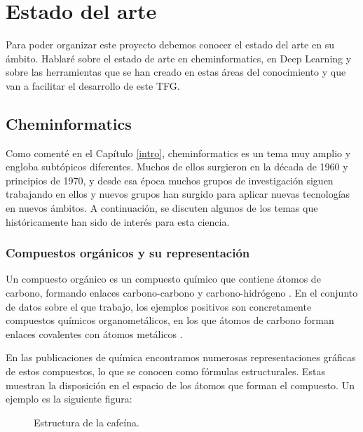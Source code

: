 \chapter{Estado del arte}
Para poder organizar este proyecto debemos conocer el estado del arte en su ámbito. Hablaré sobre el estado de arte en cheminformatics, en Deep Learning y sobre las herramientas que se han creado en estas áreas del conocimiento y que  van a facilitar el desarrollo de este TFG.

\section{Cheminformatics}
Como comenté en el Capítulo \ref{intro}, cheminformatics es un tema muy amplio y engloba subtópicos diferentes. Muchos de ellos surgieron en la década de 1960 y principios de 1970, y desde esa época muchos grupos de investigación siguen trabajando en ellos y nuevos grupos han surgido para aplicar nuevas tecnologías en nuevos ámbitos. A continuación, se discuten algunos de los temas que históricamente han sido de interés para esta ciencia. \cite{doi:10.1021/ci600234z}

\subsection{Compuestos orgánicos y su representación}
Un compuesto orgánico es un compuesto químico que contiene átomos de carbono, formando enlaces carbono-carbono y carbono-hidrógeno \cite{comporganico}. En el conjunto de datos sobre el que trabajo, los ejemplos positivos son concretamente compuestos químicos organometálicos, en los que átomos de carbono forman enlaces covalentes con átomos metálicos \cite{comporganometalico}.

En las publicaciones de química encontramos numerosas representaciones gráficas de estos compuestos, lo que se conocen como fórmulas estructurales. Estas muestran la disposición en el espacio de los átomos que forman el compuesto. Un ejemplo es la siguiente figura:

\begin{figure}[H]
\centering
    \caption{Estructura de la cafeína. \cite{decimer}}
    \label{fig:caffeine}
\end{figure}

